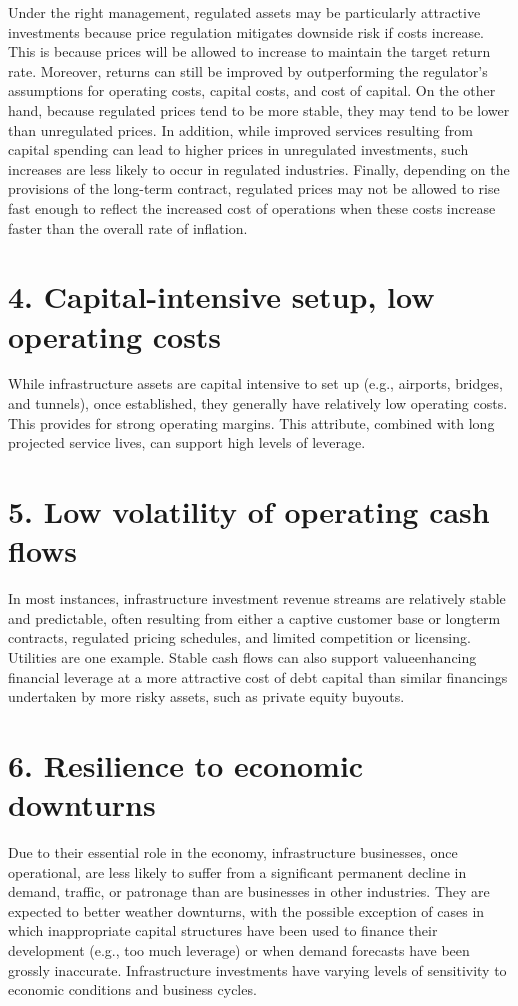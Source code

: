 \documentclass[11pt]{article}
\begin{document}
Under the right management, regulated assets may be particularly attractive investments because price regulation mitigates downside risk if costs increase. This is because prices will be allowed to increase to maintain the target return rate. Moreover, returns can still be improved by outperforming the regulator's assumptions for operating costs, capital costs, and cost of capital. On the other hand, because regulated prices tend to be more stable, they may tend to be lower than unregulated prices. In addition, while improved services resulting from capital spending can lead to higher prices in unregulated investments, such increases are less likely to occur in regulated industries. Finally, depending on the provisions of the long-term contract, regulated prices may not be allowed to rise fast enough to reflect the increased cost of operations when these costs increase faster than the overall rate of inflation.

\section*{4. Capital-intensive setup, low operating costs}
While infrastructure assets are capital intensive to set up (e.g., airports, bridges, and tunnels), once established, they generally have relatively low operating costs. This provides for strong operating margins. This attribute, combined with long projected service lives, can support high levels of leverage.

\section*{5. Low volatility of operating cash flows}
In most instances, infrastructure investment revenue streams are relatively stable and predictable, often resulting from either a captive customer base or longterm contracts, regulated pricing schedules, and limited competition or licensing. Utilities are one example. Stable cash flows can also support valueenhancing financial leverage at a more attractive cost of debt capital than similar financings undertaken by more risky assets, such as private equity buyouts.

\section*{6. Resilience to economic downturns}
Due to their essential role in the economy, infrastructure businesses, once operational, are less likely to suffer from a significant permanent decline in demand, traffic, or patronage than are businesses in other industries. They are expected to better weather downturns, with the possible exception of cases in which inappropriate capital structures have been used to finance their development (e.g., too much leverage) or when demand forecasts have been grossly inaccurate. Infrastructure investments have varying levels of sensitivity to economic conditions and business cycles.
\end{document}
